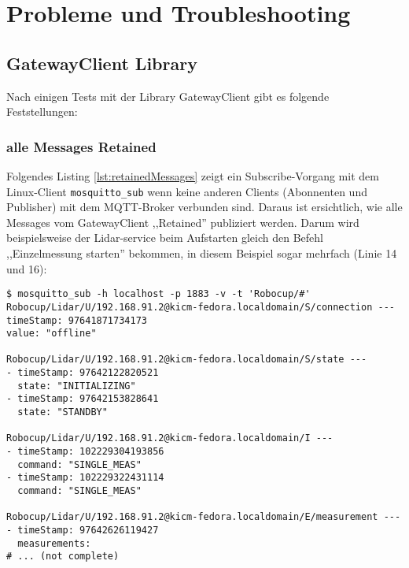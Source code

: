 \chapter{Probleme und Troubleshooting}
\section{GatewayClient Library}

Nach einigen Tests mit der Library GatewayClient gibt es folgende Feststellungen:
\subsection{alle Messages Retained}
Folgendes Listing \ref{lst:retainedMessages} zeigt ein Subscribe-Vorgang mit dem Linux-Client \verb|mosquitto_sub| wenn keine anderen Clients (Abonnenten und Publisher) mit dem MQTT-Broker verbunden sind. Daraus ist ersichtlich, wie alle Messages vom GatewayClient ,,Retained'' publiziert werden. Darum wird beispielsweise der Lidar-service beim Aufstarten gleich den Befehl ,,Einzelmessung starten'' bekommen, in diesem Beispiel sogar mehrfach (Linie 14 und 16):
\begin{lstlisting}[caption={Subscribe mit mosquitto\_sub, Aufstartverhalten},label={lst:retainedMessages}]
$ mosquitto_sub -h localhost -p 1883 -v -t 'Robocup/#' 
Robocup/Lidar/U/192.168.91.2@kicm-fedora.localdomain/S/connection ---
timeStamp: 97641871734173
value: "offline"

Robocup/Lidar/U/192.168.91.2@kicm-fedora.localdomain/S/state ---
- timeStamp: 97642122820521
  state: "INITIALIZING"
- timeStamp: 97642153828641
  state: "STANDBY"

Robocup/Lidar/U/192.168.91.2@kicm-fedora.localdomain/I ---
- timeStamp: 102229304193856
  command: "SINGLE_MEAS"
- timeStamp: 102229322431114       
  command: "SINGLE_MEAS"

Robocup/Lidar/U/192.168.91.2@kicm-fedora.localdomain/E/measurement ---
- timeStamp: 97642626119427
  measurements:
# ... (not complete)

\end{lstlisting}
